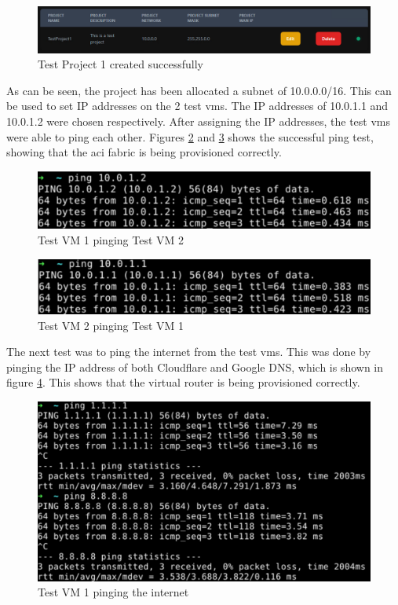 \begin{figure}[H]
    \centering
    \includegraphics[scale=0.8]{images/test-project-1.png}
    \caption{Test Project 1 created successfully}
    \label{fig:test-project-1}
\end{figure}

As can be seen, the project has been allocated a subnet of 10.0.0.0/16. This can be used to set IP addresses on the 2 test \gls{vm}s. The IP addresses of 10.0.1.1 and 10.0.1.2 were chosen respectively. After assigning the IP addresses, the test \gls{vm}s were able to ping each other. Figures \ref{fig:test-project-1-ping-1} and \ref{fig:test-project-1-ping-2} shows the successful ping test, showing that the \gls{aci} fabric is being provisioned correctly.

\begin{figure}[H]
    \centering
    \includegraphics[scale=0.7]{images/test-project-1-ping.png}
    \caption{Test VM 1 pinging Test VM 2}
    \label{fig:test-project-1-ping-1}
\end{figure}

\begin{figure}[H]
    \centering
    \includegraphics[scale=0.7]{images/test-project-1-ping-2.png}
    \caption{Test VM 2 pinging Test VM 1}
    \label{fig:test-project-1-ping-2}
\end{figure}

The next test was to ping the internet from the test \gls{vm}s. This was done by pinging the IP address of both Cloudflare and Google DNS, which is shown in figure \ref{fig:test-project-1-ping-internet}. This shows that the virtual router is being provisioned correctly.

\begin{figure}[H]
    \centering
    \includegraphics[scale=0.5]{images/test-project-1-ping-internet.png}
    \caption{Test VM 1 pinging the internet}
    \label{fig:test-project-1-ping-internet}
\end{figure}